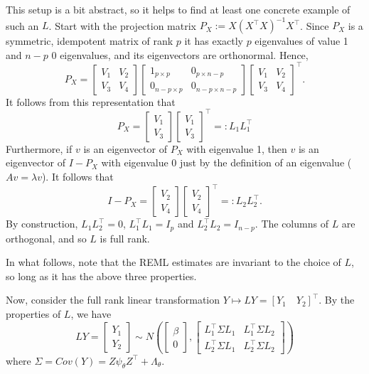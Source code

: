 \documentclass[
]{book}
\begin{document}
This setup is a bit abstract, so it helps to find at least one concrete example of such an \(L\). Start with the projection matrix \(P_X := X(X^\top X)^{-1}X^\top\). Since \(P_X\) is a symmetric, idempotent matrix of rank \(p\) it has exactly \(p\) eigenvalues of value 1 and \(n-p\) 0 eigenvalues, and its eigenvectors are orthonormal. Hence,
\[P_X = \begin{bmatrix}V_1 & V_2\\
V_3 &V_4\end{bmatrix}\begin{bmatrix}1_{p\times p} & 0_{p\times n-p}\\
0_{n-p \times p} & 0_{n-p \times n-p}\end{bmatrix}\begin{bmatrix}V_1 & V_2\\
V_3 &V_4\end{bmatrix}^\top.\]
It follows from this representation that
\[P_X = \begin{bmatrix}V_1 \\
V_3\end{bmatrix}\begin{bmatrix}V_1 \\
V_3 \end{bmatrix}^\top=:L_1L_1^\top\]
Furthermore, if \(v\) is an eigenvector of \(P_X\) with eigenvalue 1, then \(v\) is an eigenvector of \(I-P_X\) with eigenvalue 0 just by the definition of an eigenvalue (\(Av=\lambda v\)). It follows that
\[I-P_X = \begin{bmatrix}V_2 \\
V_4\end{bmatrix}\begin{bmatrix}V_2 \\
V_4 \end{bmatrix}^\top=:L_2 L_2^\top.\]
By construction, \(L_1L_2^\top = 0\), \(L_1^\top L_1 = I_p\) and \(L_2^\top L_2 = I_{n-p}\). The columns of \(L\) are orthogonal, and so \(L\) is full rank.

In what follows, note that the REML estimates are invariant to the choice of \(L\), so long as it has the above three properties.

Now, consider the full rank linear transformation \(Y \mapsto LY = [Y_1 \quad Y_2]^\top\). By the properties of \(L\), we have
\[LY = \begin{bmatrix} Y_1\\Y_2 \end{bmatrix} \sim N\left(\begin{bmatrix} \beta \\ 0\end{bmatrix}, \begin{bmatrix} L_1^\top \Sigma L_1 &L_1^\top \Sigma L_2\\ L_2^\top \Sigma L_1 & L_2^\top \Sigma L_2 \end{bmatrix}\right)\]
where \(\Sigma = Cov(Y) = Z \psi_\theta Z^\top + \Lambda_\theta\).
\end{document}
